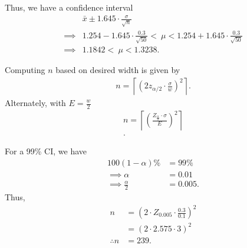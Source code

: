 \documentclass{report}
\begin{document}
Thus, we have a confidence interval
\begin{align*}
    &\bar{x} \pm 1.645 \cdot \frac{\sigma}{\sqrt{n}} \\
    \implies &1.254 - 1.645 \cdot \frac{0.3}{\sqrt{50}} <\ \mu < 1.254 + 1.645 \cdot \frac{0.3}{\sqrt{50}} \\
    \implies &1.1842 <\ \mu < 1.3238
.\end{align*}
\bigbreak \noindent 
\begin{remark}
Computing $n$ based on desired width is given by
\begin{align*}
    n = \left\lceil\left( 2z_{\alpha/2} \cdot \frac{\sigma}{w} \right)^2\right\rceil
.\end{align*}
Alternately, with $E=\frac{w}{2} $
\begin{align*}
    n = \left\lceil\left(\frac{Z_{\frac{\alpha}{2}} \cdot \sigma}{E}\right)^{2} \right\rceil \\
.\end{align*} \smiley{}
\end{remark}
\bigbreak \noindent 
For a 99\% CI, we have
\begin{align*}
    100(1-\alpha)\% &= 99\% \\
    \implies \alpha &= 0.01 \\
    \implies \frac{\alpha}{2} &= 0.005
.\end{align*}
Thus, 
\begin{align*}
    n &= \left(2\cdot Z_{0.005} \cdot \frac{0.3}{0.1}\right)^{2} \\
      &= \left(2\cdot 2.575 \cdot 3\right)^{2} \\
    \therefore n&=239
.\end{align*}
\end{document}
